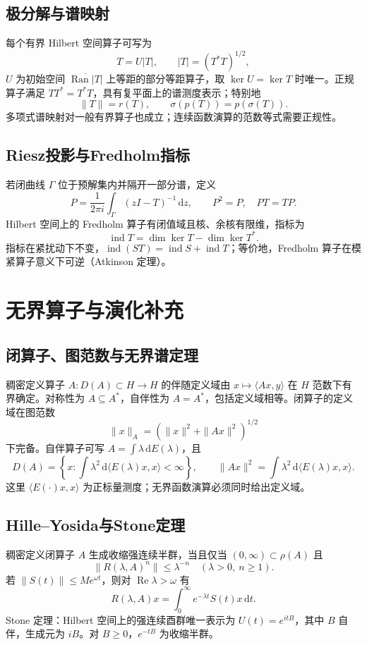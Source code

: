 \documentclass[../main.tex]{subfiles}
\begin{document}
\subsection{极分解与谱映射}
每个有界 Hilbert 空间算子可写为
\[
T=U|T|,\qquad |T|=(T^*T)^{1/2},
\]
$U$ 为初始空间 $\overline{\operatorname{Ran}|T|}$ 上等距的部分等距算子，取 $\ker U=\ker T$ 时唯一。正规算子满足 $TT^*=T^*T$，具有复平面上的谱测度表示；特别地
\[
\|T\|=r(T),\qquad \sigma(p(T))=p(\sigma(T)).
\]
多项式谱映射对一般有界算子也成立；连续函数演算的范数等式需要正规性。
\subsection{Riesz投影与Fredholm指标}
若闭曲线 $\Gamma$ 位于预解集内并隔开一部分谱，定义
\[
P=\frac1{2\pi i}\int_\Gamma(zI-T)^{-1}\,\mathrm dz,\qquad P^2=P,\quad PT=TP.
\]
Hilbert 空间上的 Fredholm 算子有闭值域且核、余核有限维，指标为
\[
\operatorname{ind}T=\dim\ker T-\dim\ker T^*.
\]
指标在紧扰动下不变，$\operatorname{ind}(ST)=\operatorname{ind}S+\operatorname{ind}T$；等价地，Fredholm 算子在模紧算子意义下可逆（Atkinson 定理）。
\section{无界算子与演化补充}
\subsection{闭算子、图范数与无界谱定理}
稠密定义算子 $A:D(A)\subset H\to H$ 的伴随定义域由 $x\mapsto\langle Ax,y\rangle$ 在 $H$ 范数下有界确定。对称性为 $A\subseteq A^*$，自伴性为 $A=A^*$，包括定义域相等。闭算子的定义域在图范数
\[
\|x\|_A=(\|x\|^2+\|Ax\|^2)^{1/2}
\]
下完备。自伴算子可写 $A=\int\lambda\,\mathrm dE(\lambda)$，且
\[
D(A)=\left\{x:\int\lambda^2\,\mathrm d\langle E(\lambda)x,x\rangle<\infty\right\},\qquad
\|Ax\|^2=\int\lambda^2\,\mathrm d\langle E(\lambda)x,x\rangle.
\]
这里 $\langle E(\cdot)x,x\rangle$ 为正标量测度；无界函数演算必须同时给出定义域。
\subsection{Hille--Yosida与Stone定理}
稠密定义闭算子 $A$ 生成收缩强连续半群，当且仅当 $(0,\infty)\subset\rho(A)$ 且
\[
\|R(\lambda,A)^n\|\le\lambda^{-n}\quad(\lambda>0,\ n\ge1).
\]
若 $\|S(t)\|\le Me^{\omega t}$，则对 $\operatorname{Re}\lambda>\omega$ 有
\[
R(\lambda,A)x=\int_0^\infty e^{-\lambda t}S(t)x\,\mathrm dt.
\]
Stone 定理：Hilbert 空间上的强连续酉群唯一表示为 $U(t)=e^{itB}$，其中 $B$ 自伴，生成元为 $iB$。对 $B\ge0$，$e^{-tB}$ 为收缩半群。
\end{document}
